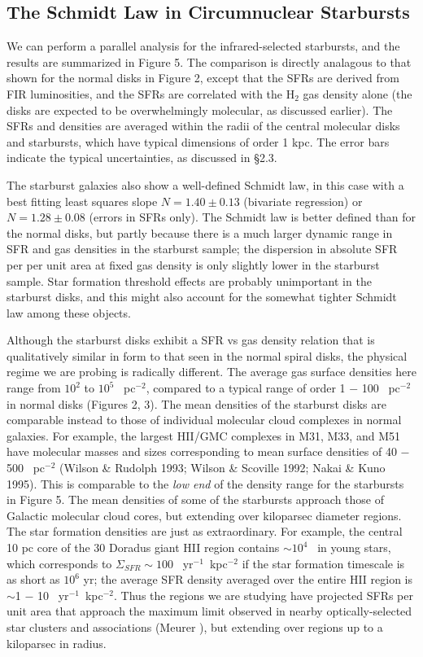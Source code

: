 \subsection{The Schmidt Law in Circumnuclear Starbursts}

We can perform a parallel analysis for the infrared-selected starbursts,
and the results are summarized in Figure 5.  The comparison 
is directly analagous to that shown for the normal disks in 
Figure 2, except that the SFRs are derived from FIR luminosities, and 
the SFRs are correlated with the H$_2$ gas density alone (the
disks are expected to be overwhelmingly molecular, as discussed earlier).
The SFRs and densities are averaged within the radii of the central
molecular disks and starbursts, which have typical dimensions of 
order 1 kpc.  The error bars indicate the typical uncertainties, as
discussed in \S2.3.

The starburst galaxies also show a well-defined Schmidt law, in this case
with a best fitting least squares slope $N = 1.40 \pm 0.13$ (bivariate
regression) or $N = 1.28 \pm 0.08$ (errors in SFRs only).
The Schmidt law is better defined than for the normal
disks, but partly because there is a much larger dynamic range in SFR and gas 
densities in the starburst sample; the dispersion in absolute SFR per
per unit area at fixed gas density is only slightly lower in the starburst
sample.  Star formation threshold effects are probably unimportant in
the starburst disks, and this might also account for the somewhat
tighter Schmidt law among these objects.

Although the starburst disks exhibit a SFR vs gas density relation that
is qualitatively similar in form to that seen in the normal spiral disks, the
physical regime we are probing is radically different.  The average gas 
surface densities 
here range from $10^2$ to $10^5$ \msun~pc$^{-2}$, compared to a typical
range of order 1 $-$ 100 \msun~pc$^{-2}$ in normal disks (Figures 2, 3).  
The mean densities of the starburst disks are comparable instead to those of
individual molecular cloud complexes in normal galaxies.
For example, the largest HII/GMC complexes in M31, M33, and M51 have
molecular masses and sizes corresponding to mean surface densities of
40 $-$ 500 \msun~pc$^{-2}$ (Wilson \& Rudolph 1993; Wilson \& Scoville 1992;
Nakai \& Kuno 1995).  This is comparable to the {\it low end} of  
the density range for the starbursts in Figure 5.  The mean densities
of some of the starbursts approach those of Galactic molecular cloud cores,
but extending over kiloparsec diameter regions.  The star formation densities
are just as extraordinary.  For example, the central 10 pc core of 
the 30 Doradus giant HII region contains $\sim 10^4$ \msun\ in young stars,
which corresponds to $\Sigma_{SFR} \sim 100$ \msun~yr$^{-1}$~kpc$^{-2}$ if
the star formation timescale is as short as $10^6$ yr;  
the average SFR density averaged over the entire HII region is 
$\sim$1 $-$ 10 \msun~yr$^{-1}$~kpc$^{-2}$.  
Thus the regions we are studying
have projected SFRs per unit area that approach the maximum limit
observed in nearby optically-selected star clusters and associations
(Meurer ), but extending over regions up to a kiloparsec in
radius.

